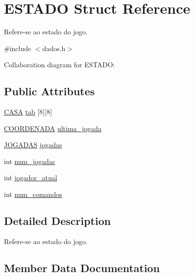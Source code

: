 \hypertarget{structESTADO}{}\section{E\+S\+T\+A\+DO Struct Reference}
\label{structESTADO}


Refere-\/se ao estado do jogo.  




{\ttfamily \#include $<$dados.\+h$>$}



Collaboration diagram for E\+S\+T\+A\+DO\+:
\subsection*{Public Attributes}
\begin{DoxyCompactItemize}
\item 
\hyperlink{dados_8h_aba91601f16d4c485b2d9b8c429f27039}{C\+A\+SA} \hyperlink{structESTADO_ab56f0f1be16954d3768b4174d14c087d}{tab} \mbox{[}8\mbox{]}\mbox{[}8\mbox{]}
\item 
\hyperlink{structCOORDENADA}{C\+O\+O\+R\+D\+E\+N\+A\+DA} \hyperlink{structESTADO_a4896a5c5c1f40b43fb795623327e3f47}{ultima\+\_\+jogada}
\item 
\hyperlink{dados_8h_a94c221d29a1760f008b7834093259b7d}{J\+O\+G\+A\+D\+AS} \hyperlink{structESTADO_afae43b87a488fad0f2b56a18bad31d18}{jogadas}
\item 
int \hyperlink{structESTADO_a261495728744647e618b4e623f5a4b7a}{num\+\_\+jogadas}
\item 
int \hyperlink{structESTADO_a5dd28e2e68b7aef2b6b7ea88e02eff58}{jogador\+\_\+atual}
\item 
int \hyperlink{structESTADO_abe6faacdd6111160bf9a354f44b95b38}{num\+\_\+comandos}
\end{DoxyCompactItemize}


\subsection{Detailed Description}
Refere-\/se ao estado do jogo. 

\subsection{Member Data Documentation}
\mbox{\label{structESTADO_afae43b87a488fad0f2b56a18bad31d18}} 
